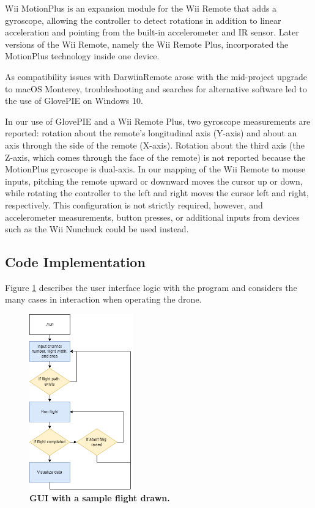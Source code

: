 \documentclass[conf]{new-aiaa}
\begin{document}
        Wii MotionPlus is an expansion module for the Wii Remote that adds a gyroscope, allowing the controller to detect rotations in addition to linear acceleration and pointing from the built-in accelerometer and IR sensor. Later versions of the Wii Remote, namely the Wii Remote Plus, incorporated the MotionPlus technology inside one device.
        
        As compatibility issues with DarwiinRemote arose with the mid-project upgrade to macOS Monterey, troubleshooting and searches for alternative software led to the use of GlovePIE on Windows 10. %
        
        In our use of GlovePIE and a Wii Remote Plus, two gyroscope measurements are reported: rotation about the remote's longitudinal axis (Y-axis) and about an axis through the side of the remote (X-axis). Rotation about the third axis (the Z-axis, which comes through the face of the remote) is not reported because the MotionPlus gyroscope is dual-axis. In our mapping of the Wii Remote to mouse inputs, pitching the remote upward or downward moves the cursor up or down, while rotating the controller to the left and right moves the cursor left and right, respectively. This configuration is not strictly required, however, and accelerometer measurements, button presses, or additional inputs from devices such as the Wii Nunchuck could be used instead.

    \subsection{Code Implementation}
    
        Figure \ref{fig:code_logic} describes the user interface logic with the program and considers the many cases in interaction when operating the drone. 
        
        \begin{figure}[H]
            \centering
            \includegraphics[width=0.4\textwidth]{docs/reports/Final Project Update/images/ae483_code_logic.png}
            \caption{\textbf{GUI with a sample flight drawn.}}
            \label{fig:code_logic}
        \end{figure}
    
\end{document}

